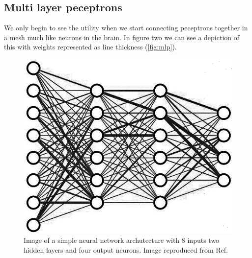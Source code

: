 \documentclass{article}
\begin{document}
\subsection{Multi layer peceptrons}
\label{sec:mlp}
We only begin to see the utility when we start connecting peceptrons together in a mesh much like neurons in the brain. In figure two we can see a depiction of this with weights represented as line thickness (\autoref{fig:mlp}). 
\begin{figure}[H]
\caption{Image of a simple neural network archutecture with 8 inputs two hidden layers and four output neurons. Image reproduced from Ref.\cite{3blue1brown}}
\label{fig:mlp}
\includegraphics[scale=2]{nn.jpg}
\end{figure}
\end{document}
